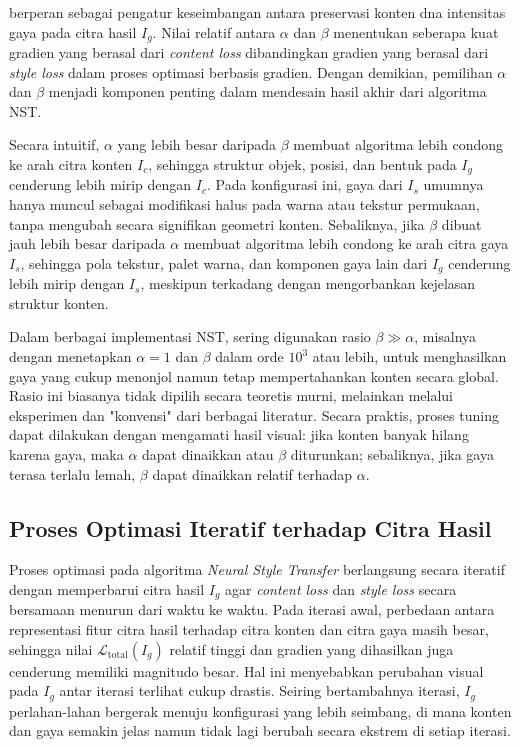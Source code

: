 berperan sebagai pengatur keseimbangan antara preservasi konten dna intensitas gaya pada citra hasil $I_g$. Nilai relatif antara $\alpha$ dan $\beta$ menentukan seberapa kuat gradien yang berasal dari \textit{content loss} dibandingkan gradien yang berasal dari \textit{style loss} dalam proses optimasi berbasis gradien. Dengan demikian, pemilihan $\alpha$ dan $\beta$ menjadi komponen penting dalam mendesain hasil akhir dari algoritma NST.

Secara intuitif, $\alpha$ yang lebih besar daripada $\beta$ membuat algoritma lebih condong ke arah citra konten $I_c$, sehingga struktur objek, posisi, dan bentuk pada $I_g$ cenderung lebih mirip dengan $I_c$. Pada konfigurasi ini, gaya dari $I_s$ umumnya hanya muncul sebagai modifikasi halus pada warna atau tekstur permukaan, tanpa mengubah secara signifikan geometri konten. Sebaliknya, jika $\beta$ dibuat jauh lebih besar daripada $\alpha$ membuat algoritma lebih condong ke arah citra gaya $I_s$, sehingga pola tekstur, palet warna, dan komponen gaya lain dari $I_g$ cenderung lebih mirip dengan $I_s$, meskipun terkadang dengan mengorbankan kejelasan struktur konten. 

Dalam berbagai implementasi NST, sering digunakan rasio $\beta \gg \alpha$, misalnya dengan menetapkan $\alpha = 1$ dan $\beta$ dalam orde $10^3$ atau lebih, untuk menghasilkan gaya yang cukup menonjol namun tetap mempertahankan konten secara global. Rasio ini biasanya tidak dipilih secara teoretis murni, melainkan melalui eksperimen dan "konvensi" dari berbagai literatur. Secara praktis, proses tuning dapat dilakukan dengan mengamati hasil visual: jika konten banyak hilang karena gaya, maka $\alpha$ dapat dinaikkan atau $\beta$ diturunkan; sebaliknya, jika gaya terasa terlalu lemah, $\beta$ dapat dinaikkan relatif terhadap $\alpha$.

\subsection{Proses Optimasi Iteratif terhadap Citra Hasil}

Proses optimasi pada algoritma \textit{Neural Style Transfer} berlangsung secara iteratif dengan memperbarui citra hasil $I_g$ agar \textit{content loss} dan \textit{style loss} secara bersamaan menurun dari waktu ke waktu. Pada iterasi awal, perbedaan antara representasi fitur citra hasil terhadap citra konten dan citra gaya masih besar, sehingga nilai $\mathcal{L}_{\text{total}}(I_g)$ relatif tinggi dan gradien yang dihasilkan juga cenderung memiliki magnitudo besar. Hal ini menyebabkan perubahan visual pada $I_g$ antar iterasi terlihat cukup drastis. Seiring bertambahnya iterasi, $I_g$ perlahan-lahan bergerak menuju konfigurasi yang lebih seimbang, di mana konten dan gaya semakin jelas namun tidak lagi berubah secara ekstrem di setiap iterasi.

